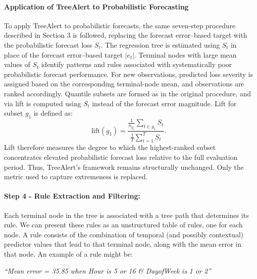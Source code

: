 \documentclass[]{interact}
\theoremstyle{definition}
\begin{document}
\paragraph{Application of TreeAlert to Probabilistic Forecasting}

To apply TreeAlert to probabilistic forecasts, the same seven-step procedure described in Section 3 is followed, replacing the forecast error–based target with the probabilistic forecast loss $S_t$. %
The regression tree is estimated using $S_t$ in place of the forecast error–based target $|e_t|$. Terminal nodes with large mean values of $S_t$ identify patterns and rules associated with systematically poor probabilistic forecast performance. For new observations, predicted loss severity is assigned based on the corresponding terminal-node mean, and observations are ranked accordingly. Quantile subsets are formed as in the original procedure, and via lift is computed using $S_t$ instead of the forecast error magnitude. Lift for subset $g_{1}$ is defined as: 
\begin{equation}
\text{lift}(g_{1}) =
\frac{
\displaystyle \frac{1}{n_{g_1}} \sum_{t \in g_{1}} S_t
}{
\displaystyle \frac{1}{T} \sum_{t=1}^{T} S_t
}.
\end{equation}
Lift therefore measures the degree to which the highest-ranked subset concentrates elevated probabilistic forecast loss relative to the full evaluation period. Thus, TreeAlert's framework remains structurally unchanged. Only the metric used to capture extremeness is replaced.

\paragraph*{Step 4 - Rule Extraction and Filtering:}
\label{sec:rule-extraction}
Each terminal node in the tree is associated with a tree path that determines its rule. We can present these rules as an unstructured table of rules, one for each node. %
A rule consists of the combination of temporal (and possibly contextual) predictor values that lead to that terminal node, along with the mean error in that node. An example of a rule might be: 
\begin{center}
\textit{``Mean error = 35.85 when Hour is 5 or 16 \& DayofWeek is 1 or 2''}
\end{center}
\end{document}
